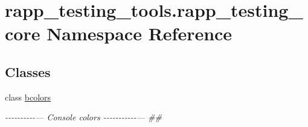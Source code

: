 \hypertarget{namespacerapp__testing__tools_1_1rapp__testing__core}{\section{rapp\-\_\-testing\-\_\-tools.\-rapp\-\_\-testing\-\_\-core Namespace Reference}
\label{namespacerapp__testing__tools_1_1rapp__testing__core}
}
\subsection*{Classes}
\begin{DoxyCompactItemize}
\item 
class \hyperlink{classrapp__testing__tools_1_1rapp__testing__core_1_1bcolors}{bcolors}
\begin{DoxyCompactList}\small\item\em -\/-\/-\/-\/-\/-\/-\/-\/-\/-\/--- Console colors -\/-\/-\/-\/-\/-\/-\/-\/-\/-\/-\/--- \#\# \end{DoxyCompactList}\end{DoxyCompactItemize}
